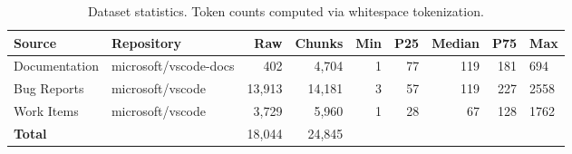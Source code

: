 \begin{table}[t]
\caption{Dataset statistics. Token counts computed via whitespace tokenization.}
\label{tab:dataset}
\centering
\small
\begin{tabular}{llrrrrrrl}
\toprule
Source & Repository & Raw & Chunks & Min & P25 & Median & P75 & Max \\
\midrule
Documentation & microsoft/vscode-docs & 402 & 4,704 & 1 & 77 & 119 & 181 & 694 \\
Bug Reports & microsoft/vscode & 13,913 & 14,181 & 3 & 57 & 119 & 227 & 2558 \\
Work Items & microsoft/vscode & 3,729 & 5,960 & 1 & 28 & 67 & 128 & 1762 \\
\midrule
\textbf{Total} & & 18,044 & 24,845 & & & & & \\
\bottomrule
\end{tabular}
\end{table}